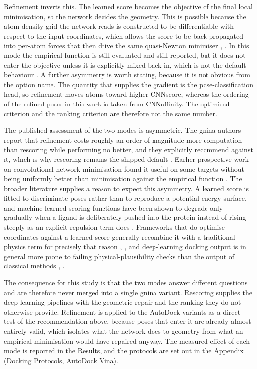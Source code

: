 Refinement inverts this. The learned score becomes the objective of the final local minimisation, so the network decides the geometry. This is possible because the atom-density grid the network reads is constructed to be differentiable with respect to the input coordinates, which allows the score to be back-propagated into per-atom forces that then drive the same quasi-Newton minimiser \cite{ref074}, \cite{ref076}. In this mode the empirical function is still evaluated and still reported, but it does not enter the objective unless it is explicitly mixed back in, which is not the default behaviour \cite{ref058}. A further asymmetry is worth stating, because it is not obvious from the option name. The quantity that supplies the gradient is the pose-classification head, so refinement moves atoms toward higher CNNscore, whereas the ordering of the refined poses in this work is taken from CNNaffinity. The optimised criterion and the ranking criterion are therefore not the same number.

The published assessment of the two modes is asymmetric. The gnina authors report that refinement costs roughly an order of magnitude more computation than rescoring while performing no better, and they explicitly recommend against it, which is why rescoring remains the shipped default \cite{ref056}. Earlier prospective work on convolutional-network minimisation found it useful on some targets without being uniformly better than minimisation against the empirical function \cite{ref077}. The broader literature supplies a reason to expect this asymmetry. A learned score is fitted to discriminate poses rather than to reproduce a potential energy surface, and machine-learned scoring functions have been shown to degrade only gradually when a ligand is deliberately pushed into the protein instead of rising steeply as an explicit repulsion term does \cite{ref078}. Frameworks that do optimise coordinates against a learned score generally recombine it with a traditional physics term for precisely that reason \cite{ref085}, \cite{ref053}, and deep-learning docking output is in general more prone to failing physical-plausibility checks than the output of classical methods \cite{ref035}, \cite{ref013}.

The consequence for this study is that the two modes answer different questions and are therefore never merged into a single gnina variant. Rescoring supplies the deep-learning pipelines with the geometric repair and the ranking they do not otherwise provide. Refinement is applied to the AutoDock variants as a direct test of the recommendation above, because poses that enter it are already almost entirely valid, which isolates what the network does to geometry from what an empirical minimisation would have repaired anyway. The measured effect of each mode is reported in the Results, and the protocols are set out in the Appendix (Docking Protocols, AutoDock Vina).

